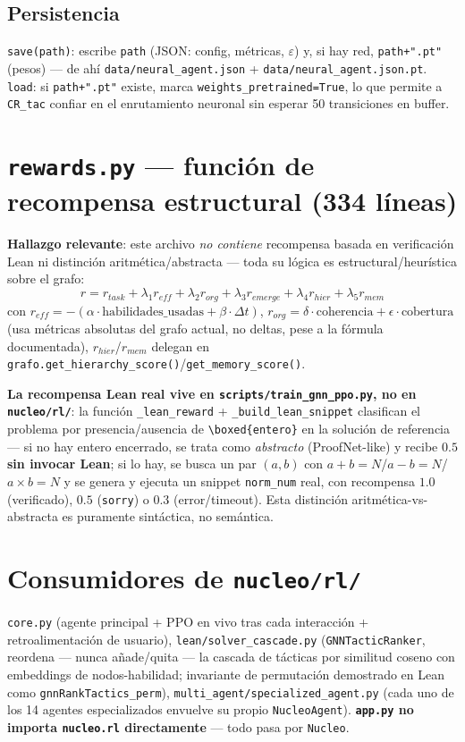 \documentclass[11pt,a4paper]{report}
\newcommand{\code}[1]{\texttt{#1}}
\begin{document}
\subsection{Persistencia}
\code{save(path)}: escribe \code{path} (JSON: config, m\'etricas, $\varepsilon$) y, si hay red, \code{path+".pt"} (pesos) --- de ah\'i \code{data/neural\_agent.json} + \code{data/neural\_agent.json.pt}. \code{load}: si \code{path+".pt"} existe, marca \code{weights_pretrained=True}, lo que permite a \code{CR\_tac} confiar en el enrutamiento neuronal sin esperar 50 transiciones en buffer.

\section{\code{rewards.py} --- funci\'on de recompensa estructural (334 l\'ineas)}

\textbf{Hallazgo relevante}: este archivo \emph{no contiene} recompensa basada en verificaci\'on Lean ni distinci\'on aritm\'etica/abstracta --- toda su l\'ogica es estructural/heur\'istica sobre el grafo:
\[
r = r_{task} + \lambda_1 r_{eff} + \lambda_2 r_{org} + \lambda_3 r_{emerge} + \lambda_4 r_{hier} + \lambda_5 r_{mem}
\]
con $r_{eff}=-(\alpha\cdot\text{habilidades\_usadas}+\beta\cdot\Delta t)$, $r_{org}=\delta\cdot\text{coherencia}+\epsilon\cdot\text{cobertura}$ (usa m\'etricas absolutas del grafo actual, no deltas, pese a la f\'ormula documentada), $r_{hier}$/$r_{mem}$ delegan en \code{grafo.get\_hierarchy\_score()}/\code{get\_memory\_score()}.

\textbf{La recompensa Lean real vive en \code{scripts/train\_gnn\_ppo.py}, no en \code{nucleo/rl/}}: la funci\'on \code{\_lean\_reward} + \code{\_build\_lean\_snippet} clasifican el problema por presencia/ausencia de \code{\textbackslash boxed\{entero\}} en la soluci\'on de referencia --- si no hay entero encerrado, se trata como \emph{abstracto} (ProofNet-like) y recibe $0.5$ \textbf{sin invocar Lean}; si lo hay, se busca un par $(a,b)$ con $a+b=N$/$a-b=N$/$a\times b=N$ y se genera y ejecuta un snippet \code{norm\_num} real, con recompensa $1.0$ (verificado), $0.5$ (\code{sorry}) o $0.3$ (error/timeout). Esta distinci\'on aritm\'etica-vs-abstracta es puramente sint\'actica, no sem\'antica.

\section{Consumidores de \code{nucleo/rl/}}

\code{core.py} (agente principal + PPO en vivo tras cada interacci\'on + retroalimentaci\'on de usuario), \code{lean/solver_cascade.py} (\code{GNNTacticRanker}, reordena --- nunca a\~nade/quita --- la cascada de t\'acticas por similitud coseno con embeddings de nodos-habilidad; invariante de permutaci\'on demostrado en Lean como \code{gnnRankTactics\_perm}), \code{multi_agent/specialized_agent.py} (cada uno de los 14 agentes especializados envuelve su propio \code{NucleoAgent}). \textbf{\code{app.py} no importa \code{nucleo.rl} directamente} --- todo pasa por \code{Nucleo}.
\end{document}
